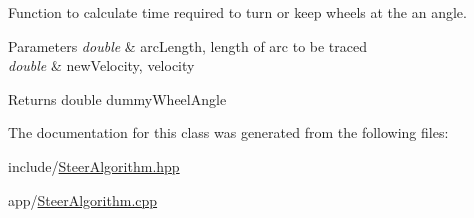 Function to calculate time required to turn or keep wheels at the an angle. 


\begin{DoxyParams}{Parameters}
{\em double} & arc\+Length, length of arc to be traced \\
\hline
{\em double} & new\+Velocity, velocity \\
\hline
\end{DoxyParams}
\begin{DoxyReturn}{Returns}
double dummy\+Wheel\+Angle 
\end{DoxyReturn}


The documentation for this class was generated from the following files\+:\begin{DoxyCompactItemize}
\item 
include/\hyperlink{_steer_algorithm_8hpp}{Steer\+Algorithm.\+hpp}\item 
app/\hyperlink{_steer_algorithm_8cpp}{Steer\+Algorithm.\+cpp}\end{DoxyCompactItemize}
